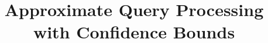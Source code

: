 \documentclass[10pt]{article}
\theoremstyle{definition}
\begin{document}
\title{Approximate Query Processing with Confidence Bounds}
\author{}
\maketitle











\end{document}
